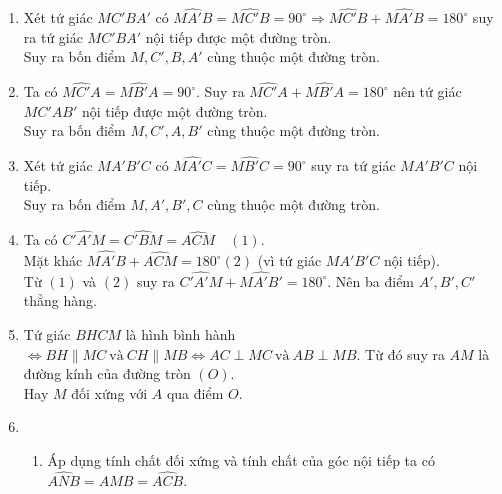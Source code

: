 \begin{bt}
{\begin{center}
			
		\end{center}
		\begin{enumerate}
			\item Xét tứ giác $MC'BA'$ có $\widehat{MA'B} = \widehat{MC'B} = 90^\circ \Rightarrow \widehat{MC'B}+\widehat{MA'B}= 180^\circ$ suy ra tứ giác $MC'BA'$ nội tiếp được một đường tròn.\\
			Suy ra bốn điểm $M, C', B, A'$ cùng thuộc một đường tròn.
			\item Ta có $\widehat{MC'A} = \widehat{MB'A} = 90^\circ$. Suy ra $\widehat{MC'A} + \widehat{MB'A} = 180^\circ$ nên tứ giác $MC'AB'$ nội tiếp được một đường tròn.\\
			Suy ra bốn điểm $M, C', A, B'$ cùng thuộc một đường tròn.
			\item Xét tứ giác $MA'B'C$ có $\widehat{MA'C} = \widehat{MB'C} = 90^\circ$ suy ra tứ giác $MA'B'C$ nội tiếp.\\
			Suy ra bốn điểm $M, A', B', C$ cùng thuộc một đường tròn.
			\item Ta có $\widehat{C'A'M} = \widehat{C'BM} = \widehat{ACM} \quad (1)$.\\
			Mặt khác $\widehat{MA'B} + \widehat{ACM} = 180^\circ (2)$ (vì tứ giác $MA'B'C$ nội tiếp). \\
			Từ $(1)$ và $(2)$ suy ra $\widehat{C'A'M} + \widehat{MA'B'} = 180^\circ$. Nên ba điểm $A', B', C'$ thẳng hàng.
			\item Tứ giác $BHCM$ là hình bình hành $\Leftrightarrow 
			BH \parallel MC\ \text{và}\ CH \parallel MB \Leftrightarrow AC \perp MC\ \text{và}\ AB\perp MB$. Từ đó suy ra $AM$ là đường kính của đường tròn $(O)$.\\
			Hay $M$ đối xứng với $A$ qua điểm $O$.
			\item 
			\begin{enumerate}[1)]
				\item Áp dụng tính chất đối xứng và tính chất của góc nội tiếp ta có $\widehat{ANB} = \widehat{AMB} = \widehat{ACB}$.\\

\end{enumerate}
\end{enumerate}}
\end{bt}
